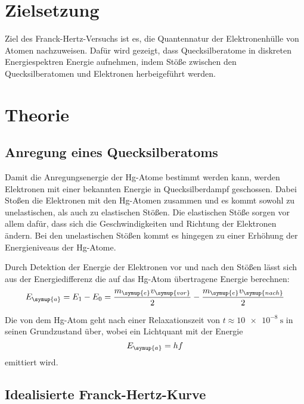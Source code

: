 \section{Zielsetzung}
Ziel des Franck-Hertz-Versuchs ist es, die Quantennatur der Elektronenhülle von Atomen nachzuweisen. Dafür wird gezeigt, dass 
Quecksilberatome in diskreten Energiespektren Energie aufnehmen, indem Stöße zwischen den Quecksilberatomen und Elektronen 
herbeigeführt werden.

\section{Theorie}
\label{sec:Theorie}
\subsection{Anregung eines Quecksilberatoms}
\label{sec:Anregung}
Damit die Anregungsenergie der Hg-Atome bestimmt werden kann, werden Elektronen mit einer bekannten Energie in Quecksilberdampf 
geschossen. Dabei Stoßen die Elektronen mit den Hg-Atomen zusammen und es kommt sowohl zu unelastischen, als auch zu elastischen 
Stößen.
Die elastischen Stöße sorgen vor allem dafür, dass sich die Geschwindigkeiten und Richtung der Elektronen ändern. Bei den unelastischen
Stößen kommt es hingegen zu einer Erhöhung der Energieniveaus der Hg-Atome.

Durch Detektion der Energie der Elektronen vor und nach den Stößen lässt sich aus der Energiedifferenz die auf das Hg-Atom übertragene
Energie berechnen:
\begin{equation}
    E_{\symup{a}} = E_1-E_0 = \frac{m_{\symup{e}}v_{\symup{vor}}}{2}-\frac{m_{\symup{e}}v_{\symup{nach}}}{2}
    \label{eq:Anregungsenergie}
\end{equation}

Die von dem Hg-Atom geht nach einer Relaxationszeit von $t\approx\qty{10e-8}{\second}$ in seinen Grundzustand über,
wobei ein Lichtquant mit der Energie
\begin{equation*}
    E_{\symup{a}} = hf
\end{equation*}
emittiert wird.

\subsection{Idealisierte Franck-Hertz-Kurve}
\label{sec:Frank-Hertz-Kurve}